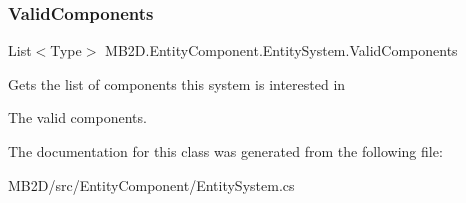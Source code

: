\subsubsection{\texorpdfstring{Valid\+Components}{ValidComponents}}
{\footnotesize\ttfamily List$<$Type$>$ M\+B2\+D.\+Entity\+Component.\+Entity\+System.\+Valid\+Components\hspace{0.3cm}{\ttfamily [get]}}



Gets the list of components this system is interested in 

The valid components.

The documentation for this class was generated from the following file\+:\begin{DoxyCompactItemize}
\item 
M\+B2\+D/src/\+Entity\+Component/Entity\+System.\+cs\end{DoxyCompactItemize}
